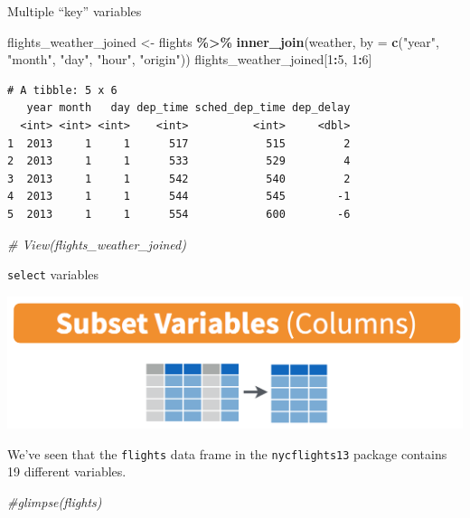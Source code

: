 \documentclass[
  ignorenonframetext,
]{beamer}
\newenvironment{Shaded}{\begin{snugshade}}{\end{snugshade}}
\newcommand{\AttributeTok}[1]{\textcolor[rgb]{0.13,0.29,0.53}{#1}}
\newcommand{\CommentTok}[1]{\textcolor[rgb]{0.56,0.35,0.01}{\textit{#1}}}
\newcommand{\DecValTok}[1]{\textcolor[rgb]{0.00,0.00,0.81}{#1}}
\newcommand{\FunctionTok}[1]{\textcolor[rgb]{0.13,0.29,0.53}{\textbf{#1}}}
\newcommand{\NormalTok}[1]{#1}
\newcommand{\OtherTok}[1]{\textcolor[rgb]{0.56,0.35,0.01}{#1}}
\newcommand{\SpecialCharTok}[1]{\textcolor[rgb]{0.81,0.36,0.00}{\textbf{#1}}}
\newcommand{\StringTok}[1]{\textcolor[rgb]{0.31,0.60,0.02}{#1}}
\begin{document}
\begin{frame}[fragile]{Multiple ``key'' variables}
\protect\hypertarget{multiple-key-variables-1}{}
\normalsize

\begin{Shaded}
\begin{Highlighting}[]
\NormalTok{flights\_weather\_joined }\OtherTok{\textless{}{-}}\NormalTok{ flights }\SpecialCharTok{\%\textgreater{}\%}
  \FunctionTok{inner\_join}\NormalTok{(weather, }\AttributeTok{by =} \FunctionTok{c}\NormalTok{(}\StringTok{"year"}\NormalTok{, }\StringTok{"month"}\NormalTok{, }\StringTok{"day"}\NormalTok{, }
                             \StringTok{"hour"}\NormalTok{, }\StringTok{"origin"}\NormalTok{))}
\NormalTok{flights\_weather\_joined[}\DecValTok{1}\SpecialCharTok{:}\DecValTok{5}\NormalTok{, }\DecValTok{1}\SpecialCharTok{:}\DecValTok{6}\NormalTok{]}
\end{Highlighting}
\end{Shaded}

\begin{verbatim}
# A tibble: 5 x 6
   year month   day dep_time sched_dep_time dep_delay
  <int> <int> <int>    <int>          <int>     <dbl>
1  2013     1     1      517            515         2
2  2013     1     1      533            529         4
3  2013     1     1      542            540         2
4  2013     1     1      544            545        -1
5  2013     1     1      554            600        -6
\end{verbatim}

\begin{Shaded}
\begin{Highlighting}[]
\CommentTok{\# View(flights\_weather\_joined)}
\end{Highlighting}
\end{Shaded}

\normalsize
\end{frame}

\begin{frame}[fragile]{\texttt{select} variables}
\protect\hypertarget{select-variables}{}
\begin{center}\includegraphics[width=0.6\linewidth,height=0.45\textheight]{week3_8} \end{center}

We've seen that the \texttt{flights} data frame in the
\texttt{nycflights13} package contains 19 different variables.

\normalsize

\begin{Shaded}
\begin{Highlighting}[]
\CommentTok{\#glimpse(flights)}
\end{Highlighting}
\end{Shaded}

\normalsize
\end{frame}
\end{document}
